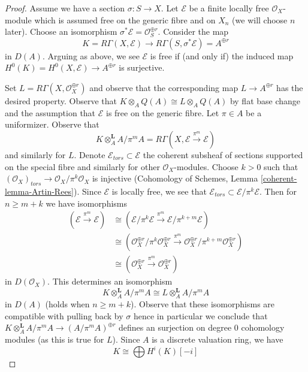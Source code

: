 \begin{proof}
\medskip\noindent
Assume we have a section $\sigma : S \to X$. Let $\mathcal{E}$
be a finite locally free $\mathcal{O}_X$-module which is assumed
free on the generic fibre and on $X_n$ (we will choose $n$ later).
Choose an isomorphism $\sigma^*\mathcal{E} = \mathcal{O}_S^{\oplus r}$.
Consider the map
$$
K = R\Gamma(X, \mathcal{E}) \longrightarrow
R\Gamma(S, \sigma^*\mathcal{E}) = A^{\oplus r}
$$
in $D(A)$. Arguing as above, we see $\mathcal{E}$ is free if (and only if)
the induced map $H^0(K) = H^0(X, \mathcal{E}) \to A^{\oplus r}$ is surjective.

\medskip\noindent
Set $L = R\Gamma(X, \mathcal{O}_X^{\oplus r})$ and observe that the
corresponding map $L \to A^{\oplus r}$ has the desired property.
Observe that $K \otimes_A Q(A) \cong L \otimes_A Q(A)$
by flat base change and the assumption that $\mathcal{E}$
is free on the generic fibre. Let $\pi \in A$ be a uniformizer. Observe that
$$
K \otimes_A^\mathbf{L} A/\pi^m A =
R\Gamma(X, \mathcal{E} \xrightarrow{\pi^m} \mathcal{E})
$$
and similarly for $L$.
Denote $\mathcal{E}_{tors} \subset \mathcal{E}$ the coherent subsheaf of
sections supported on the special fibre and similarly for other
$\mathcal{O}_X$-modules. Choose $k > 0$ such that
$(\mathcal{O}_X)_{tors} \to \mathcal{O}_X/\pi^k \mathcal{O}_X$
is injective (Cohomology of Schemes, Lemma \ref{coherent-lemma-Artin-Rees}).
Since $\mathcal{E}$ is locally free, we see
that $\mathcal{E}_{tors} \subset \mathcal{E}/\pi^k\mathcal{E}$.
Then for $n \geq m + k$ we have isomorphisms
\begin{align*}
(\mathcal{E} \xrightarrow{\pi^m} \mathcal{E})
& \cong
(\mathcal{E}/\pi^k\mathcal{E} \xrightarrow{\pi^m}
\mathcal{E}/\pi^{k + m}\mathcal{E}) \\
& \cong
(\mathcal{O}_X^{\oplus r}/\pi^k\mathcal{O}_X^{\oplus r} \xrightarrow{\pi^m}
\mathcal{O}_X^{\oplus r}/\pi^{k + m}\mathcal{O}_X^{\oplus r}) \\
& \cong
(\mathcal{O}_X^{\oplus r} \xrightarrow{\pi^m} \mathcal{O}_X^{\oplus r})
\end{align*}
in $D(\mathcal{O}_X)$. This determines an isomorphism
$$
K \otimes_A^\mathbf{L} A/\pi^m A \cong L \otimes_A^\mathbf{L} A/\pi^m A
$$
in $D(A)$ (holds when $n \geq m + k$). Observe that these isomorphisms
are compatible with pulling back by $\sigma$ hence in particular
we conclude that
$K \otimes_A^\mathbf{L} A/\pi^m A \to (A/\pi^m A)^{\oplus r}$
defines an surjection on degree $0$ cohomology modules (as
this is true for $L$).
Since $A$ is a discrete valuation ring, we have
$$
K \cong \bigoplus H^i(K)[-i]
$$
\end{proof}
